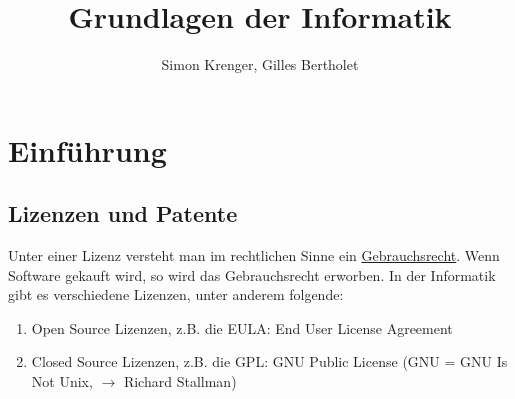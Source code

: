 \documentclass{report}
\title{Grundlagen der Informatik}
\author{Simon Krenger, Gilles Bertholet}
\begin{document}
\maketitle
\chapter{Einführung}
\section{Lizenzen und Patente}
Unter einer Lizenz versteht man im rechtlichen Sinne ein \underline{Gebrauchsrecht}. Wenn Software gekauft wird, so wird das Gebrauchsrecht erworben. In der Informatik gibt es verschiedene Lizenzen, unter anderem folgende:
\begin{enumerate}
\item Open Source Lizenzen, z.B. die EULA: End User License Agreement
\item Closed Source Lizenzen, z.B. die GPL: GNU Public License (GNU = GNU Is Not Unix, $\to$ Richard Stallman)
\end{enumerate}
\end{document}
